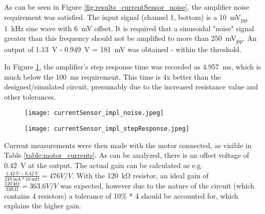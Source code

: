 As can be seen in Figure \ref{fig:results_currentSensor_noise}, the amplifier noise requirement was satisfied. The input signal
(channel 1, bottom) is a \SI{10}{mV_{pp}} \SI{1}{kHz} sine wave with \SI{6}{mV} offset. It is required that a sinusoidal "noise" signal greater than this frequency
should not be amplified to more than \SI{250}{mV_{pp}}. An output of \SI{1.13}{V} - \SI{0.949}{V} = \SI{181}{mV} was obtained - within the threshold.

In Figure \ref{fig:results_currentSensor_response}, the amplifier's step response time was recorded as \SI{4.957}{ms}, which is much below the \SI{100}{ms} requirement.
This time is 4x better than the designed/simulated circuit, presumably due to the increased resistance value and other tolerances.

\begin{figure}[!h]
   \centering
   \begin{minipage}{0.45\textwidth}
      \centering
      \texttt{[image: currentSensor\_impl\_noise.jpeg]}
      \label{fig:results_currentSensor_noise}
   \end{minipage}
   \begin{minipage}{0.45\textwidth}
      \centering
      \texttt{[image: currentSensor\_impl\_stepResponse.jpeg]}
      \label{fig:results_currentSensor_response}
   \end{minipage}
\end{figure}

Current measurements were then made with the motor connected, as visible in Table \ref{table:motor_currents}.
As can be analyzed, there is an offset voltage of \SI{0.42}{V} at the output. The actual gain can be calculated as e.g.
$\frac{\SI{1.42}{V} - \SI{0.42}{V}}{\SI{210}{\milli\ampere} * \SI{10}{\milli\ohm}}= 476 V/V$. With the \SI{120}{\kilo\ohm} resistor,
an ideal gain of $\frac{\SI{120}{\kilo\ohm}}{\SI{330}{\ohm}} = 363.6V/V$ was expected, however due to the nature of the circuit
(which contains 4 resistors) a tolerance of 10\% * 4 should be accounted for, which explains the higher gain.

